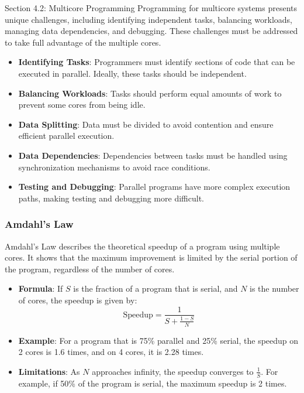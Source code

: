 \begin{notes}{Section 4.2: Multicore Programming}
    Programming for multicore systems presents unique challenges, including identifying independent tasks, balancing workloads, managing data dependencies, and debugging. These challenges must be addressed 
    to take full advantage of the multiple cores.
    
    \begin{highlight}
    
        \begin{itemize}
            \item \textbf{Identifying Tasks}: Programmers must identify sections of code that can be executed in parallel. Ideally, these tasks should be independent.
            \item \textbf{Balancing Workloads}: Tasks should perform equal amounts of work to prevent some cores from being idle.
            \item \textbf{Data Splitting}: Data must be divided to avoid contention and ensure efficient parallel execution.
            \item \textbf{Data Dependencies}: Dependencies between tasks must be handled using synchronization mechanisms to avoid race conditions.
            \item \textbf{Testing and Debugging}: Parallel programs have more complex execution paths, making testing and debugging more difficult.
        \end{itemize}
    
    \end{highlight}
    
    \subsubsection*{Amdahl's Law}
    
    Amdahl’s Law describes the theoretical speedup of a program using multiple cores. It shows that the maximum improvement is limited by the serial portion of the program, regardless of the number of cores.
    
    \begin{highlight}
    
        \begin{itemize}
            \item \textbf{Formula}: If $S$ is the fraction of a program that is serial, and $N$ is the number of cores, the speedup is given by:
            \[
            \text{Speedup} = \frac{1}{S + \frac{1 - S}{N}}
            \]
            \item \textbf{Example}: For a program that is 75\% parallel and 25\% serial, the speedup on 2 cores is 1.6 times, and on 4 cores, it is 2.28 times.
            \item \textbf{Limitations}: As $N$ approaches infinity, the speedup converges to $\frac{1}{S}$. For example, if 50\% of the program is serial, the maximum speedup is 2 times.
        \end{itemize}
    

\end{highlight}
\end{notes}
